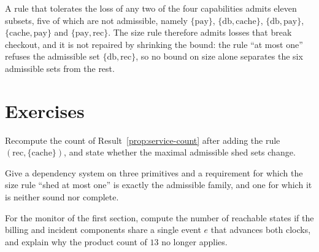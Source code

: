 A rule that tolerates the loss of any two of the four capabilities admits eleven subsets, five of which are not admissible, namely $\{\mathrm{pay}\}$, $\{\mathrm{db},\mathrm{cache}\}$, $\{\mathrm{db},\mathrm{pay}\}$, $\{\mathrm{cache},\mathrm{pay}\}$ and $\{\mathrm{pay},\mathrm{rec}\}$. The size rule therefore admits losses that break checkout, and it is not repaired by shrinking the bound: the rule ``at most one'' refuses the admissible set $\{\mathrm{db},\mathrm{rec}\}$, so no bound on size alone separates the six admissible sets from the rest.

\section*{Exercises}

\begin{exercise}
Recompute the count of Result~\ref{prop:service-count} after adding the rule $(\mathrm{rec},\{\mathrm{cache}\})$, and state whether the maximal admissible shed sets change.
\end{exercise}

\begin{exercise}
Give a dependency system on three primitives and a requirement for which the size rule ``shed at most one'' is exactly the admissible family, and one for which it is neither sound nor complete.
\end{exercise}

\begin{exercise}
For the monitor of the first section, compute the number of reachable states if the billing and incident components share a single event $e$ that advances both clocks, and explain why the product count of $13$ no longer applies.
\end{exercise}
